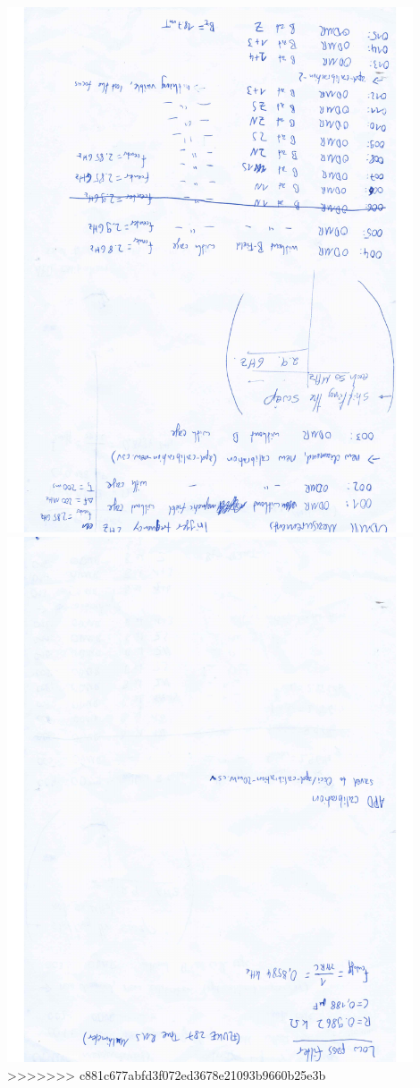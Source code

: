 \includegraphics[width=0.9\textwidth,angle=180]{../labbook/labbook-5.pdf}
\includegraphics[width=0.9\textwidth,angle=180]{../labbook/labbook-6.pdf}
>>>>>>> c881c677abfd3f072ed3678e21093b9660b25e3b
